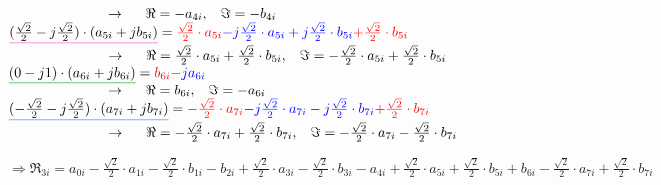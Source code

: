 $\hspace{2.5cm}\rightarrow \hspace{0.5cm} \Re=-a_{4i}, \hspace{0.3cm}\Im=-b_{4i}$\\

$\mathunderline{pink}{(\frac{\sqrt{2}}{2}-j\frac{\sqrt{2}}{2}) \cdot (a_{5i}+jb_{5i})} = \textcolor{red}{\frac{\sqrt{2}}{2} \cdot a_{5i}} \textcolor{blue}{-j\frac{\sqrt{2}}{2} \cdot a_{5i} + j\frac{\sqrt{2}}{2} \cdot b_{5i}} \textcolor{red}{+\frac{\sqrt{2}}{2} \cdot b_{5i}}$\\

$\hspace{2.5cm}\rightarrow \hspace{0.5cm} \Re=\frac{\sqrt{2}}{2} \cdot a_{5i} +\frac{\sqrt{2}}{2} \cdot b_{5i}, \hspace{0.3cm} \Im=-\frac{\sqrt{2}}{2} \cdot a_{5i} + \frac{\sqrt{2}}{2} \cdot b_{5i}$\\

$\mathunderline{mygreen}{(0-j1) \cdot (a_{6i}+jb_{6i})} = \textcolor{red}{b_{6i}}\textcolor{blue}{-ja_{6i}}$\\

$\hspace{2.5cm}\rightarrow \hspace{0.5cm} \Re=b_{6i}, \hspace{0.3cm}\Im=-a_{6i}$\\

$\mathunderline{azure}{(-\frac{\sqrt{2}}{2}-j\frac{\sqrt{2}}{2}) \cdot (a_{7i}+jb_{7i})} = \textcolor{red}{-\frac{\sqrt{2}}{2} \cdot a_{7i}}\textcolor{blue}{-j\frac{\sqrt{2}}{2} \cdot a_{7i} - j\frac{\sqrt{2}}{2} \cdot b_{7i}} \textcolor{red}{+\frac{\sqrt{2}}{2} \cdot b_{7i}}$\\

$\hspace{2.5cm}\rightarrow \hspace{0.5cm} \Re=-\frac{\sqrt{2}}{2} \cdot a_{7i} +\frac{\sqrt{2}}{2} \cdot b_{7i}, \hspace{0.3cm} \Im=-\frac{\sqrt{2}}{2} \cdot a_{7i} - \frac{\sqrt{2}}{2} \cdot b_{7i}$\\


\vspace{0.5cm}

\noindent$\Rightarrow \Re_{3i} = a_{0i} -\frac{\sqrt{2}}{2} \cdot a_{1i} -\frac{\sqrt{2}}{2} \cdot b_{1i} -b_{2i} +\frac{\sqrt{2}}{2} \cdot a_{3i} -\frac{\sqrt{2}}{2} \cdot b_{3i} -a_{4i} +\frac{\sqrt{2}}{2} \cdot a_{5i} +\frac{\sqrt{2}}{2} \cdot b_{5i} + b_{6i} -\frac{\sqrt{2}}{2} \cdot a_{7i} +\frac{\sqrt{2}}{2} \cdot b_{7i}$\\

